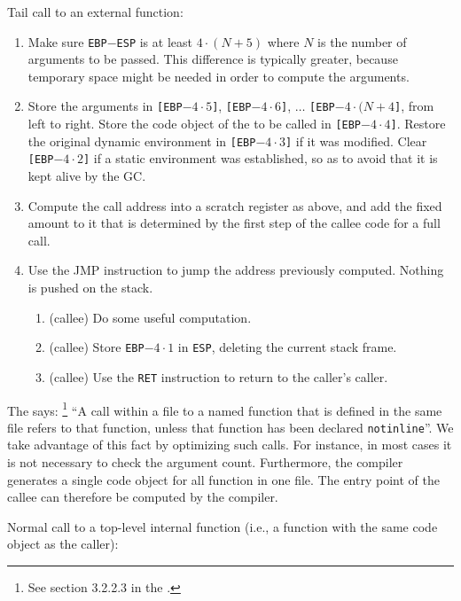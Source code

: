 Tail call to an external function:

\begin{enumerate}
\item Make sure \texttt{EBP}$-$\texttt{ESP} is at least $4 \cdot (N +
  5)$ where $N$ is the number of arguments to be passed.  This
  difference is typically greater, because temporary space might be
  needed in order to compute the arguments.
\item Store the arguments in 
  \texttt{[EBP$- 4 \cdot 5$]}, 
  \texttt{[EBP$- 4 \cdot 6$]}, 
  $\ldots$
  \texttt{[EBP$- 4 \cdot (N + 4$]},
  from left to right.  Store the code object of the to be called in
  \texttt{[EBP$- 4 \cdot 4$]}.  
  Restore the original dynamic environment in 
  \texttt{[EBP$- 4 \cdot 3$]}
  if it was modified.  Clear 
  \texttt{[EBP$- 4 \cdot 2$]} if a static environment was
  established, so as to avoid that it is kept alive by the GC.
\item Compute the call address into a scratch register as above, and
  add the fixed amount to it that is determined by the first step of
  the callee code for a full call.
\item Use the JMP instruction to jump the address previously computed.
  Nothing is pushed on the stack. 
  \begin{enumerate}
  \item (callee) Do some useful computation.
  \item (callee) Store \texttt{EBP$- 4 \cdot 1$} in \texttt{ESP},
    deleting the current stack frame.
  \item (callee) Use the \texttt{RET} instruction to return to the
    caller's caller.
  \end{enumerate}
\end{enumerate}

The \hs{} says:%
\footnote{See section 3.2.2.3 in the \hs{}.}
``A call within a file to a named function that is defined in the same
file refers to that function, unless that function has been declared
\texttt{notinline}''.  We take advantage of this fact by optimizing
such calls.  For instance, in most cases it is not necessary to check
the argument count.  Furthermore, the compiler generates a single code
object for all function in one file.  The entry point of the callee
can therefore be computed by the compiler. 

Normal call to a top-level internal function (i.e., a function with
the same code object as the caller):

